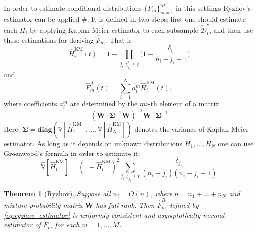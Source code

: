 \documentclass[12pt,reqno,a4paper,oneside,draft]{article}
\theoremstyle{plain}
\newtheorem{thm}{Theorem}[section]
\theoremstyle{definition}
\theoremstyle{remark}
\begin{document}
In order to estimate conditional distributions $\{F_m\}_{m=1}^M$ in this settings Ryzhov's estimator can be applied $\#$. It is defined in two steps: first one should estimate each $H_i$ by applying Kaplan-Meier estimator to each subsample $\tilde{\mathcal D}^c_i$, and then use these estimations for deriving $\hat F_m$. That is
\begin{equation}
\hat H^{\mathrm{KM}}_i (t) = 1 - \prod _{j_i:\xi ^*_{j_i} \leq t} \Bigg(1 - \frac {\delta _{j_i}}{n_i - j_i + 1}\Bigg)
\end{equation}
and
\begin{equation}
\label{eq:ryzhov_estimator}
\hat F^{\mathrm{R}}_m(t) = \sum _{i=1}^N a_i^m \hat H^{\mathrm{KM}}_i(t),
\end{equation}
where coefficients $a_i^m$ are determined by the $mi$-th element of a matrix
\begin{equation}
(\mathbf W^\top \boldsymbol{\Sigma}^{-1}\mathbf W)^{-1} \mathbf W^\top \boldsymbol{\Sigma}^{-1}
\end{equation}
Here, $\boldsymbol{\Sigma} = \mathbf{diag}(\mathbb V [\hat H^{\mathrm{KM}}_1], \ldots, \mathbb V[\hat H^{\mathrm{KM}}_N])$ denotes the variance of Kaplan-Meier estimator. As long as it depends on unknown distributions $H_1, \ldots, H_N$ one can use Greenwood's formula in order to estimate it:
\begin{equation}
\hat{\mathbb V}[\hat H^{\mathrm{KM}}_i] = (1 - \hat H^{\mathrm{KM}}_i)^2 \sum _{j_i:\xi _{j_i} \leq t}\frac {\delta _{j_i}}{(n_i - j_i)(n_i - j_i + 1)}
\end{equation}
\begin{thm}[Ryzhov]
Suppose all $n_i = O(n)$, where $n = n_1 + \ldots + n_N$ and mixture probability matrix $\mathbf W$ has full rank. Then $\hat F^R_m$ defined by \eqref{eq:ryzhov_estimator} is uniformly consistent and asymptotically normal estimator of $F_m$ for each $m=1,\ldots , M$.
\end{thm}
\end{document}
